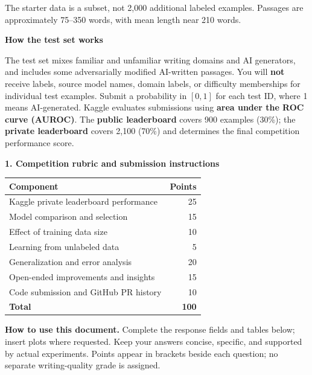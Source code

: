 \documentclass[11pt,letterpaper]{article}
\begin{document}
\vspace{4pt}
{\footnotesize The starter data is a subset, not 2,000 additional labeled examples. Passages are approximately 75--350 words, with mean length near 210 words.}

\vspace{10pt}
{\large\textbf{How the test set works}}
\vspace{4pt}

The test set mixes familiar and unfamiliar writing domains and AI generators, and includes some adversarially modified AI-written passages. You will \textbf{not} receive labels, source model names, domain labels, or difficulty memberships for individual test examples. Submit a probability in $[0, 1]$ for each test ID, where 1 means AI-generated. Kaggle evaluates submissions using \textbf{area under the ROC curve (AUROC)}. The \textbf{public leaderboard} covers 900 examples (30\%); the \textbf{private leaderboard} covers 2,100 (70\%) and determines the final competition performance score.

\newpage

{\large\textbf{1. Competition rubric and submission instructions}}
\vspace{4pt}

\begin{tabularx}{0.7\textwidth}{@{}Xr@{}}
\toprule
\textbf{Component} & \textbf{Points} \\
\midrule
Kaggle private leaderboard performance & 25 \\
Model comparison and selection & 15 \\
Effect of training data size & 10 \\
Learning from unlabeled data & 5 \\
Generalization and error analysis & 20 \\
Open-ended improvements and insights & 15 \\
Code submission and GitHub PR history & 10 \\
\midrule
\textbf{Total} & \textbf{100} \\
\bottomrule
\end{tabularx}

\vspace{8pt}
\textbf{How to use this document.} Complete the response fields and tables below; insert plots where requested. Keep your answers concise, specific, and supported by actual experiments. Points appear in brackets beside each question; no separate writing-quality grade is assigned.
\end{document}
